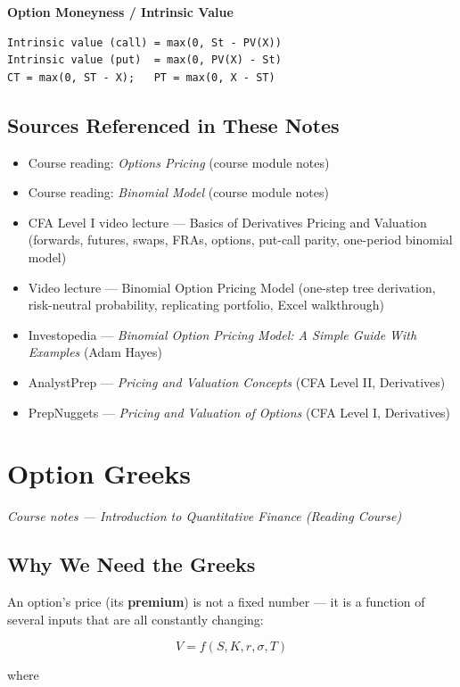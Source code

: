 \documentclass[12pt,openany]{book}
\theoremstyle{definition}
\theoremstyle{remark}
\begin{document}
\textbf{Option Moneyness / Intrinsic Value}
\begin{lstlisting}[style=notesCode]
Intrinsic value (call) = max(0, St - PV(X))
Intrinsic value (put)  = max(0, PV(X) - St)
CT = max(0, ST - X);   PT = max(0, X - ST)
\end{lstlisting}


\section{Sources Referenced in These Notes}

\begin{itemize}
\item Course reading: \emph{Options Pricing} (course module notes)
\item Course reading: \emph{Binomial Model} (course module notes)
\item CFA Level I video lecture — Basics of Derivatives Pricing and Valuation (forwards, futures, swaps, FRAs, options, put-call parity, one-period binomial model)
\item Video lecture — Binomial Option Pricing Model (one-step tree derivation, risk-neutral probability, replicating portfolio, Excel walkthrough)
\item Investopedia — \emph{Binomial Option Pricing Model: A Simple Guide With Examples} (Adam Hayes)
\item AnalystPrep — \emph{Pricing and Valuation Concepts} (CFA Level II, Derivatives)
\item PrepNuggets — \emph{Pricing and Valuation of Options} (CFA Level I, Derivatives)
\end{itemize}

\chapter{Option Greeks}

\emph{Course notes — Introduction to Quantitative Finance (Reading Course)}


\section{Why We Need the Greeks}

An option's price (its \textbf{premium}) is not a fixed number — it is a function of several inputs that are all constantly changing:

\[
V = f(S, K, r, \sigma, T)
\]

where
\end{document}
